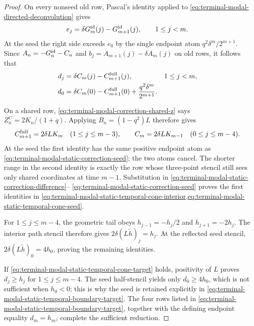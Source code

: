 \begin{proof}
On every nonseed old row, Pascal's identity applied to
\eqref{eq:terminal-modal-directed-deconvolution} gives
\[
 e_j=\delta G_m^{\rm id}(j)-G_{m+1}^{\rm id}(j),
 \qquad 1\le j<m.
\]
At the seed the right side exceeds $e_0$ by the single endpoint atom
$q^2\delta^m/2^{m+1}$.  Since
$A_n=-G_n^{\rm id}-C_n$ and
$b_j=A_{m+1}(j)-\delta A_m(j)$ on old rows, it follows that
\begin{align}
 d_j&=\delta C_m(j)-C_{m+1}^{\rm full}(j),
 &&1\le j<m,
 \label{eq:terminal-modal-static-correction-difference}\\
 d_0&=\delta C_m(0)-C_{m+1}^{\rm full}(0)
 +\frac{q^2\delta^m}{2^{m+1}}.
 \label{eq:terminal-modal-static-correction-seed}
\end{align}

On a shared row,
\eqref{eq:terminal-modal-correction-shared-z} says
$Z_n^C=2K_n/(1+q)$.  Applying
$B_n=(1-q^2)L$ therefore gives
\[
 C_{m+1}^{\rm full}=2\delta LK_m
 \quad(1\le j\le m-3),\qquad
 C_m=2\delta LK_{m-1}
 \quad(0\le j\le m-4).
\]
At the seed the first identity has the same positive endpoint atom as
\eqref{eq:terminal-modal-static-correction-seed}; the two atoms cancel.
The shorter range in the second identity is exactly the row whose
three-point stencil still sees only shared coordinates at time $m-1$.
Substitution in
\eqref{eq:terminal-modal-static-correction-difference}--
\eqref{eq:terminal-modal-static-correction-seed} proves the first identities
in \cref{eq:terminal-modal-static-temporal-cone-interior,eq:terminal-modal-static-temporal-cone-seed}.

For $1\le j\le m-4$, the geometric tail obeys
$h_{j-1}=-h_j/2$ and $h_{j+1}=-2h_j$.  The interior path stencil therefore
gives $2\delta(L\widetilde h)_j=h_j$.  At the reflected seed stencil,
$2\delta(L\widetilde h)_0=4h_0$, proving the remaining identities.

If \eqref{eq:terminal-modal-static-temporal-cone-target} holds, positivity of
$L$ proves $d_j\ge h_j$ for $1\le j\le m-4$.  The seed half-stencil yields
only $d_0\ge4h_0$, which is not sufficient when $h_0<0$; this is why the seed
is retained explicitly in
\eqref{eq:terminal-modal-static-temporal-boundary-target}.  The four rows
listed in \eqref{eq:terminal-modal-static-temporal-boundary-target}, together
with the defining endpoint equality $d_m=h_m$, complete the sufficient
reduction.
\end{proof}




